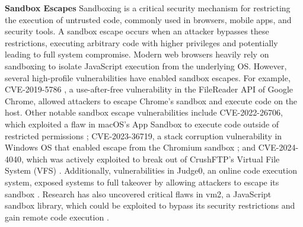 \noindent\textbf{Sandbox Escapes} Sandboxing is a critical security mechanism for restricting the execution of untrusted code, commonly used in browsers, mobile apps, and security tools. A sandbox escape occurs when an attacker bypasses these restrictions, executing arbitrary code with higher privileges and potentially leading to full system compromise. Modern web browsers heavily rely on sandboxing to isolate JavaScript execution from the underlying OS. However, several high-profile vulnerabilities have enabled sandbox escapes. For example, CVE-2019-5786 \cite{chromezeroday}, a use-after-free vulnerability in the FileReader API of Google Chrome, allowed attackers to escape Chrome's sandbox and execute code on the host. Other notable sandbox escape vulnerabilities include CVE-2022-26706, which exploited a flaw in macOS's App Sandbox to execute code outside of restricted permissions \cite{macossandboxescape}; CVE-2023-36719, a stack corruption vulnerability in Windows OS that enabled escape from the Chromium sandbox \cite{chromiumsandboxescape}; and CVE-2024-4040, which was actively exploited to break out of CrushFTP’s Virtual File System (VFS) \cite{crushftpsandboxescape}. Additionally, vulnerabilities in Judge0, an online code execution system, exposed systems to full takeover by allowing attackers to escape its sandbox \cite{judge0sandboxescape}. Research has also uncovered critical flaws in vm2, a JavaScript sandbox library, which could be exploited to bypass its security restrictions and gain remote code execution \cite{vm2sandboxescape}.
